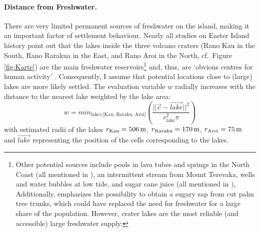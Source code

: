 \paragraph{Distance from Freshwater.}
There are very limited permanent sources of freshwater on the island, making it an important factor of settlement behaviour. 
Nearly all studies on Easter Island history point out that the lakes inside the three volcano craters (Rano Kau in the South, Rano Rarakua in the East, and Rano Aroi in the North, cf.\ Figure \ref{fig:Karte}) are the main freshwater reservoirs\footnote{Other potential sources include pools in lava tubes and springs in the North Coast (all mentioned in ), an intermittent stream from Mount Terevaka, wells and water bubbles at low tide, and sugar cane juice (all mentioned in ), 
Additionally, \citet{Mieth2015} emphasizes the possibility to obtain a sugary sap from cut palm tree trunks, which could have replaced the need for freshwater for a large share of the population.
However, crater lakes are the most reliable (and accessible) large freshwater supply.}
and, thus, are `obvious centres for human activity' \citep{Bahn2017}.
Consequently, I assume that potential locations close to (large) lakes are more likely settled.
The evaluation variable $w$ radially increases with the distance to the nearest lake weighted by the lake area:
\begin{equation}
	w = min_{\text{lake}\in \text{[Kau, Raraku, Aroi]}} \left( \frac{||
		 \vec{c}- \vec{lake}||^2}{r_\text{lake}^2\pi} \right)
\end{equation}
with estimated radii of the lakes $r_\text{Kau} = 506\, \rm{m}$, $r_\text{Raraku} = 170\, \rm{m}$, $r_\text{Aroi} = 75\, \rm{m}$ and $\vec{lake}$ representing the position of the cells corresponding to the lakes.

